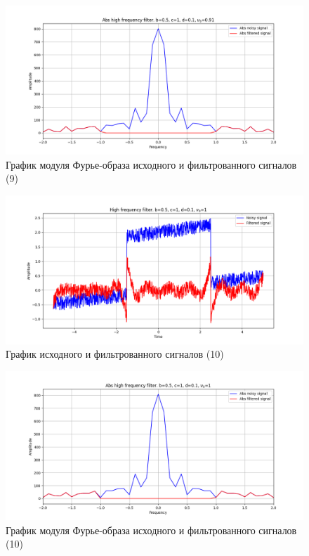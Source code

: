 \documentclass[a4paper, 12pt]{article}
\begin{document}
    \begin{figure}[!htb]
        \centering
        \includegraphics[scale=0.48]{9_abs_u_U_nolow.png}
        \captionsetup{skip=0pt}
        \caption{График модуля Фурье-образа исходного и фильтрованного сигналов (9)}
        \label{fig:fig44}
    \end{figure}
    \begin{figure}[!htb]
        \centering
        \includegraphics[scale=0.48]{10_u_flt_u_nolow.png}
        \captionsetup{skip=0pt}
        \caption{График исходного и фильтрованного сигналов (10)}
        \label{fig:fig45}
    \end{figure}
    \begin{figure}[!htb]
        \centering
        \includegraphics[scale=0.48]{10_abs_u_U_nolow.png}
        \captionsetup{skip=0pt}
        \caption{График модуля Фурье-образа исходного и фильтрованного сигналов (10)}
        \label{fig:fig46}
    \end{figure}
\end{document}
